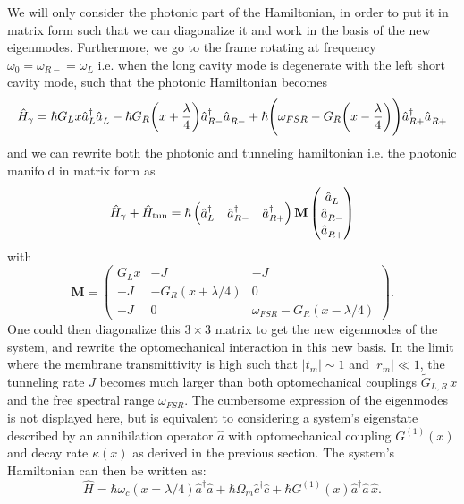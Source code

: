 We will only consider the photonic part of the Hamiltonian, in order to put it in matrix form such that we can diagonalize it and work in the basis of the new eigenmodes. Furthermore, we go to the frame rotating at frequency $\omega_0 = \omega_{R-} = \omega_L$ i.e. when the long cavity mode is degenerate with the left short cavity mode, such that the photonic Hamiltonian becomes
\begin{equation}
 \hat H_\gamma = \hbar  G_L x  \hat a_L^\dagger \hat a_L^{\vphantom{\dagger}}
 - \hbar  G_R \bigg(x+ \dfrac{\lambda}{4}\bigg)  \hat a_{R-}^\dagger \hat a_{R-}^{\vphantom{\dagger}}
 + \hbar \Bigg(\omega_{FSR} -  G_R \bigg(x- \dfrac{\lambda}{4}\bigg) \Bigg) \hat a_{R+}^\dagger \hat a_{R+}^{\vphantom{\dagger}}\end{equation}
and we can rewrite both the photonic and tunneling hamiltonian i.e. the photonic manifold in matrix form as
\begin{equation} 
  \hat H_\gamma + \hat H_{\rm tun} = \hbar
  \begin{pmatrix}
    \hat a_L^\dagger & \hat a_{R-}^\dagger & \hat a_{R+}^\dagger
  \end{pmatrix}
  \mathbf{M}
  \begin{pmatrix}
    \hat a_L^{\vphantom{\dagger}} \\
    \hat a_{R-}^{\vphantom{\dagger}} \\
    \hat a_{R+}^{\vphantom{\dagger}}
  \end{pmatrix}
\end{equation}
with 
\begin{equation*}
  \mathbf{M} =
  \begin{pmatrix}
    G_L x & -J & -J \\
    -J & - G_R (x + \lambda/4) & 0 \\
    -J & 0 & \omega_{FSR} -  G_R (x - \lambda/4)
  \end{pmatrix}.
\end{equation*}
One could then diagonalize this \(3 \times 3\) matrix to get the new eigenmodes of the system, and rewrite the optomechanical interaction in this new basis. In the limit where the membrane transmittivity is high such that \( |t_m| \sim 1\) and \( |r_m| \ll 1\), the tunneling rate \(J\) becomes much larger than both optomechanical couplings \(\tilde G_{L,R}\, x\) and the free spectral range \(\omega_{FSR}\). The cumbersome expression of the eigenmodes is not displayed here, but is equivalent to considering a system's eigenstate described by an annihilation operator \(\hat a \) with optomechanical coupling \( G^{(1)}(x)\) and decay rate \(\kappa(x)\) as derived in the previous section. The system's Hamiltonian can then be written as:
\begin{equation}
\hat{H} = \hbar \omega_c(x=\lambda/4) \hat a^\dagger \hat{a} + \hbar \Omega_m \hat c^\dagger \hat c + \hbar G^{(1)}(x) \hat a^\dagger \hat a \,  \hat x.
\end{equation}

